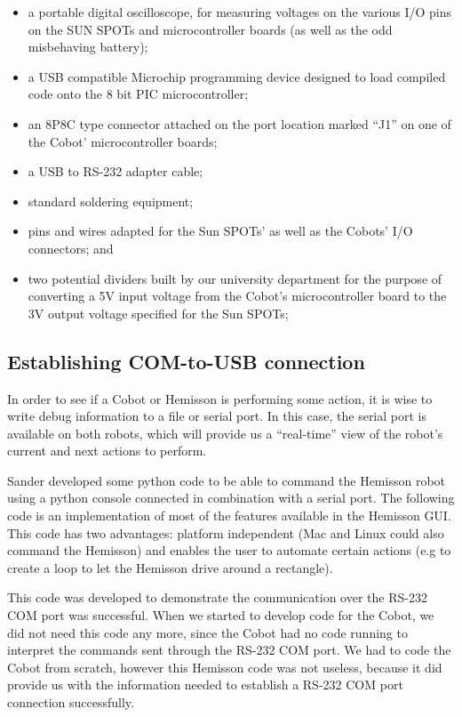\documentclass[a4paper,10pt]{article} %
\begin{document}
\begin{itemize}
    \item a portable digital oscilloscope, for measuring voltages on the various
    I/O pins on the SUN SPOTs and microcontroller boards (as well as the odd
    misbehaving battery);
    \item a USB compatible Microchip programming device designed to load compiled code
    onto the 8 bit PIC microcontroller;
    \item an 8P8C type connector attached on the port location marked ``J1'' on
    one of the Cobot' microcontroller boards;
    \item a USB to RS-232 adapter cable;
    \item standard soldering equipment;
    \item pins and wires adapted for the Sun SPOTs' as well as the Cobots' I/O
    connectors; and
    \item two potential dividers built by our university department for the
    purpose of converting a 5V input voltage from the Cobot's microcontroller
    board to the 3V output voltage specified for the Sun SPOTs;
\end{itemize}


\subsection{Establishing COM-to-USB connection} %
\label{sub:Establishing COM-to-USB connection}

In order to see if a Cobot or Hemisson is performing some action, it is wise to
write debug information to a file or serial port. In this case, the serial port
is available on both robots, which will provide us a ``real-time'' view of the
robot's current and next actions to perform.

Sander developed some python code to be able to command the Hemisson robot using
a python console connected in combination with a serial port. The following code
is an implementation of most of the features available in the Hemisson GUI.
This code has two advantages: platform independent (Mac and Linux could also
command the Hemisson) and enables the user to automate certain actions (e.g to
create a loop to let the Hemisson drive around a rectangle).



\noindent This code was developed to demonstrate the communication over the
RS-232 COM port was successful. When we started to develop code for the Cobot,
we did not need this code any more, since the Cobot had no code running to
interpret the commands sent through the RS-232 COM port. We had to code the
Cobot from scratch, however this Hemisson code was not useless, because it did
provide us with the information needed to establish a RS-232 COM port
connection successfully.
\end{document}

